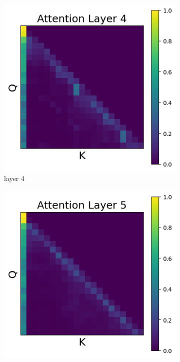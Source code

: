 \documentclass[11pt]{article}
\begin{document}
\begin{figure}[t]
  \begin{subfigure}[t]{0.24\textwidth}
    \centering
    \includegraphics[width=1.4\columnwidth]{figures/intervention5_2/layer_4.png}
    \caption{layer 4}
    \label{fig:intervention5_2_layer4}
  \end{subfigure}\hfill
  \begin{subfigure}[t]{0.24\textwidth}
    \centering
    \includegraphics[width=1.4\columnwidth]{figures/intervention5_2/layer_5.png}

\end{subfigure}
\end{figure}
\end{document}
